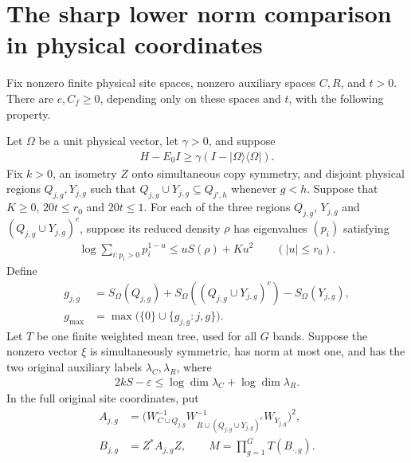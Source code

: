 \section{The sharp lower norm comparison in physical coordinates}

\begin{theorem}
  \label{thm:regional_sharp_lower_norm}
    \leanok
  Fix nonzero finite physical site spaces, nonzero auxiliary spaces $C,R$,
  and $t>0$. There are $c,C_f\geq0$, depending only on these
  spaces and $t$, with the following property.

  Let $\Omega$ be a unit physical vector, let $\gamma>0$, and suppose
  \begin{align*}
    H-E_0I\geq\gamma(I-|\Omega\rangle\langle\Omega|).
  \end{align*}
  Fix $k>0$, an isometry $Z$ onto simultaneous copy symmetry, and
  disjoint physical regions $Q_{j,g},Y_{j,g}$ such that
  $Q_{j,g}\cup Y_{j,g}\subseteq Q_{j',h}$ whenever $g<h$.
  Suppose that $K\geq0$, $20t\leq r_0$ and $20t\leq1$.
  For each of the three regions
  $Q_{j,g}$, $Y_{j,g}$ and $(Q_{j,g}\cup Y_{j,g})^c$, suppose its
  reduced density $\rho$ has eigenvalues $(p_i)$ satisfying
  \begin{align*}
    \log\sum_{i:p_i>0}p_i^{1-u}
      \leq uS(\rho)+Ku^2 \qquad (|u|\leq r_0).
  \end{align*}
  Define
  \begin{align*}
    g_{j,g}&=S_\Omega(Q_{j,g})+
      S_\Omega((Q_{j,g}\cup Y_{j,g})^c)-S_\Omega(Y_{j,g}),\\
    g_{\max}&=\max\bigl(\{0\}\cup\{g_{j,g}:j,g\}\bigr).
  \end{align*}
  Let $T$ be one finite weighted mean tree, used for all $G$ bands.
  Suppose the nonzero vector $\xi$ is simultaneously symmetric,
  has norm at most one, and has the two original auxiliary labels
  $\lambda_C,\lambda_R$, where
  \begin{align*}
    2kS-\varepsilon\leq\log\dim\lambda_C+\log\dim\lambda_R.
  \end{align*}
  In the full original site coordinates, put
  \begin{align*}
    A_{j,g}
      &=\bigl(W_{C\cup Q_{j,g}}^{-1}
          W_{R\cup(Q_{j,g}\cup Y_{j,g})^c}^{-1}W_{Y_{j,g}}\bigr)^2,\\
    B_{j,g}&=Z^*A_{j,g}Z,\qquad
    M=\prod_{g=1}^{G}T(B_{\cdot,g}).
  \end{align*}

\end{theorem}

